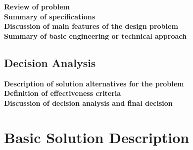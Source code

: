 \documentclass[letterpaper,12pt]{article}
\newcommand{\xxx}[1]{{\color{red}\bf #1}}
\begin{document}
\xxx{Review of problem}\\
\xxx{Summary of specifications}\\
\xxx{Discussion of main features of the design problem}\\
\xxx{Summary of basic engineering or technical approach}

\subsection{Decision Analysis}
\label{sec:decisionanalysis}

\xxx{Description of solution alternatives for the problem}\\
\xxx{Definition of effectiveness criteria}\\
\xxx{Discussion of decision analysis and final decision}

\section{Basic Solution Description}
\label{sec:basicsoldesc}
\end{document}
